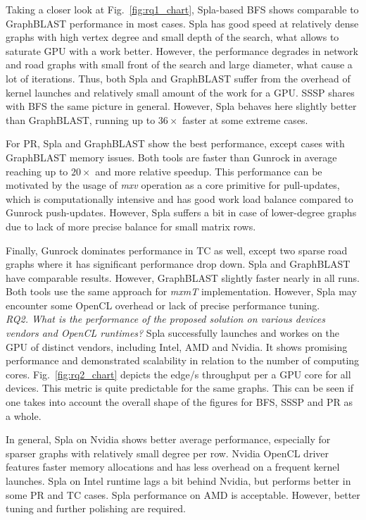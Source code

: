 Taking a closer look at Fig.~\ref{fig:rq1_chart}, Spla-based BFS shows comparable to GraphBLAST performance in most cases. Spla has good speed at relatively dense graphs with high vertex degree and small depth of the search, what allows to saturate GPU with a work better. However, the performance degrades in network and road graphs with small front of the search and large diameter, what cause a lot of iterations. Thus, both Spla and GraphBLAST suffer from the overhead of kernel launches and relatively small amount of the work for a GPU. SSSP shares with BFS the same picture in general. However, Spla behaves here slightly better than GraphBLAST, running up to $36\times$ faster at some extreme cases.

For PR, Spla and GraphBLAST show the best performance, except cases with GraphBLAST memory issues. Both tools are faster than Gunrock in average reaching up to $20\times$ and more relative speedup. This performance can be motivated by the usage of \textit{mxv} operation as a core primitive for pull-updates, which is computationally intensive and has good work load balance compared to Gunrock push-updates. However, Spla suffers a bit in case of lower-degree graphs due to lack of more precise balance for small matrix rows.

Finally, Gunrock dominates performance in TC as well, except two sparse road graphs where it has significant performance drop down. Spla and GraphBLAST have comparable results. However, GraphBLAST slightly faster nearly in all runs. Both tools use the same approach for \textit{mxmT} implementation. However, Spla may encounter some OpenCL overhead or lack of precise performance tuning.\\

\textit{RQ2. What is the performance of the proposed solution on various devices vendors and OpenCL runtimes?} Spla successfully launches and workes on the GPU of distinct vendors, including Intel, AMD and Nvidia. It shows promising performance and demonstrated scalability in relation to the number of computing cores. Fig.~\ref{fig:rq2_chart} depicts the edge/s throughput per a GPU core for all devices. This metric is quite predictable for the same graphs. This can be seen if one takes into account the overall shape of the figures for BFS, SSSP and PR as a whole.

In general, Spla on Nvidia shows better average performance, especially for sparser graphs with relatively small degree per row. Nvidia OpenCL driver features faster memory allocations and has less overhead on a frequent kernel launches. Spla on Intel runtime lags a bit behind Nvidia, but performs better in some PR and TC cases. Spla performance on AMD is acceptable. However, better tuning and further polishing are required.\\

